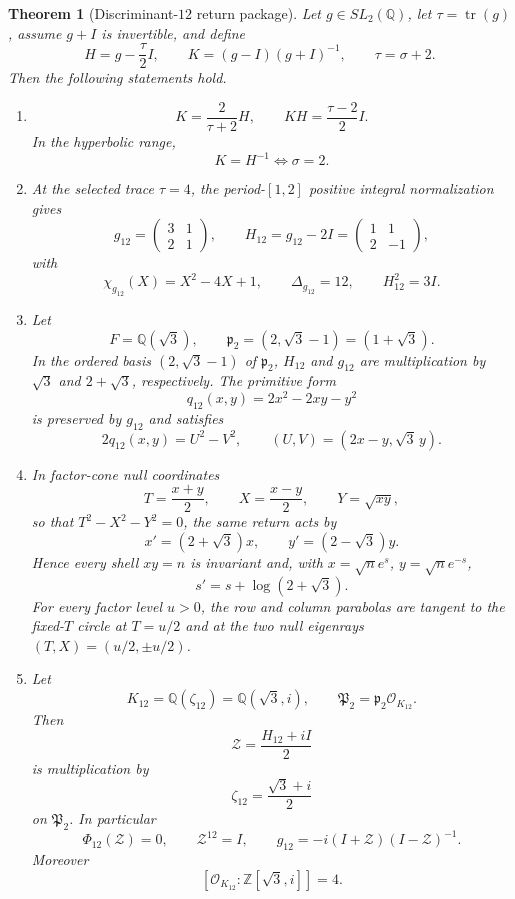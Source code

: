 \documentclass[11pt]{article}
\newtheorem{theorem}{Theorem}[section]
\theoremstyle{definition}
\theoremstyle{remark}
\newcommand{\Q}{\mathbb Q}
\newcommand{\Z}{\mathbb Z}
\newcommand{\OO}{\mathcal O}
\newcommand{\tr}{\operatorname{tr}}
\begin{document}
\begin{theorem}[Discriminant-$12$ return package]
\label{thm:main}
Let $g\in SL_2(\Q)$, let $\tau=\tr(g)$, assume $g+I$ is invertible, and define
\[
H=g-\frac\tau2I,
\qquad
K=(g-I)(g+I)^{-1},
\qquad
\tau=\sigma+2.
\]
Then the following statements hold.

\begin{enumerate}[label=(\roman*)]
\item
\[
K=\frac{2}{\tau+2}H,
\qquad
KH=\frac{\tau-2}{2}I.
\]
In the hyperbolic range,
\[
K=H^{-1}\iff\sigma=2.
\]

\item At the selected trace $\tau=4$, the period-$[1,2]$ positive integral
normalization gives
\[
g_{12}=\begin{pmatrix}3&1\\2&1\end{pmatrix},
\qquad
H_{12}=g_{12}-2I
=\begin{pmatrix}1&1\\2&-1\end{pmatrix},
\]
with
\[
\chi_{g_{12}}(X)=X^2-4X+1,
\qquad
\Delta_{g_{12}}=12,
\qquad
H_{12}^2=3I.
\]

\item Let
\[
F=\Q(\sqrt3),
\qquad
\mathfrak p_2=(2,\sqrt3-1)=(1+\sqrt3).
\]
In the ordered basis $(2,\sqrt3-1)$ of $\mathfrak p_2$,
$H_{12}$ and $g_{12}$ are multiplication by $\sqrt3$ and $2+\sqrt3$,
respectively.  The primitive form
\[
q_{12}(x,y)=2x^2-2xy-y^2
\]
is preserved by $g_{12}$ and satisfies
\[
2q_{12}(x,y)=U^2-V^2,
\qquad
(U,V)=(2x-y,\sqrt3\,y).
\]

\item In factor-cone null coordinates
\[
T=\frac{x+y}{2},\qquad X=\frac{x-y}{2},\qquad Y=\sqrt{xy},
\]
so that $T^2-X^2-Y^2=0$, the same return acts by
\[
\boxed{x'=(2+\sqrt3)x,\qquad y'=(2-\sqrt3)y.}
\]
Hence every shell $xy=n$ is invariant and, with
$x=\sqrt n e^s$, $y=\sqrt n e^{-s}$,
\[
s'=s+\log(2+\sqrt3).
\]
For every factor level $u>0$, the row and column parabolas are tangent to the
fixed-$T$ circle at $T=u/2$ and at the two null eigenrays
$(T,X)=(u/2,\pm u/2)$.

\item Let
\[
K_{12}=\Q(\zeta_{12})=\Q(\sqrt3,i),
\qquad
\mathfrak P_2=\mathfrak p_2\OO_{K_{12}}.
\]
Then
\[
\mathcal Z=\frac{H_{12}+iI}{2}
\]
is multiplication by
\[
\zeta_{12}=\frac{\sqrt3+i}{2}
\]
on $\mathfrak P_2$.  In particular
\[
\Phi_{12}(\mathcal Z)=0,
\qquad
\mathcal Z^{12}=I,
\qquad
 g_{12}=-i(I+\mathcal Z)(I-\mathcal Z)^{-1}.
\]
Moreover
\[
[\OO_{K_{12}}:\Z[\sqrt3,i]]=4.
\]


\end{enumerate}
\end{theorem}
\end{document}
